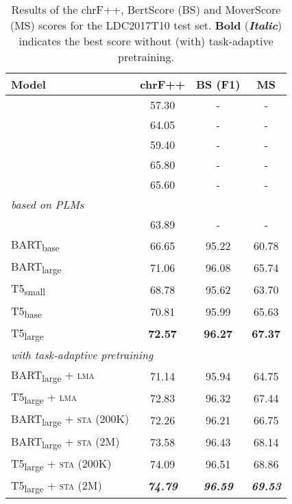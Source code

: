 \documentclass[11pt]{article}
\begin{document}
\begin{table}[t]
{\renewcommand{\arraystretch}{0.6}
\begin{tabular}{@{\hspace*{1mm}}l@{\hspace*{1mm}}c@{\hspace*{2mm}}c@{\hspace*{2mm}}c@{\hspace*{1mm}}}  
\toprule
\textbf{Model} & \textbf{chrF++} & \textbf{BS (F1)} & \textbf{MS}  \\
\midrule
\citet{dcgcnforgraph2seq19guo} & 57.30 & - & - \\
\citet{zhu-etal-2019-modeling} & 64.05 & - & - \\
\citet{cai-lam-2020-graph} & 59.40 & - & - \\
\citet{doi:10.116200297} &  65.80 & - & - \\
\citet{yao-etal-2020-heterogeneous}  &  65.60 & - & - \\
\midrule
\small{\textit{based on PLMs}}  &  \\[.2em]
\citet{mager2020gpttoo}  & 63.89  & -& - \\
\midrule
BART\textsubscript{base}  &  66.65 & 95.22 & 60.78  \\
BART\textsubscript{large}  & 71.06 & 96.08 & 65.74  \\
T5\textsubscript{small} &  68.78 & 95.62 & 63.70  \\
T5\textsubscript{base} & 70.81 & 95.99 & 65.63  \\
T5\textsubscript{large} & \textbf{72.57} & \textbf{96.27} & \textbf{67.37} \\
\midrule
\multicolumn{3}{l}{\small{\textit{with task-adaptive pretraining}}}  \\[.2em]
BART\textsubscript{large} + \textsc{lma} & 71.14 & 95.94 & 64.75  \\
T5\textsubscript{large} + \textsc{lma} & 72.83 & 96.32 & 67.44  \\[.7em]
BART\textsubscript{large} + \textsc{sta} \small{\textsc{(200K)}} & 72.26 & 96.21 &66.75 \\
BART\textsubscript{large} + \textsc{sta} \small{\textsc{(2M)}} & 73.58 & 96.43 & 68.14 \\
T5\textsubscript{large} + \textsc{sta} \small{\textsc{(200K)}} & 74.09 & 96.51 & 68.86 \\
T5\textsubscript{large} + \textsc{sta} \small{\textsc{(2M)}} & \textbf{\textit{74.79}} & \textbf{\textit{96.59}} & \textbf{\textit{69.53}} \\
\bottomrule
\end{tabular}}
\caption{Results of the chrF++, BertScore (BS) and MoverScore (MS) scores for the LDC2017T10 test set. \textbf{Bold} (\textbf{\textit{Italic}}) indicates the best score without (with) task-adaptive pretraining.}
\label{tab:results-amr-appendix}
\end{table}
\end{document}
